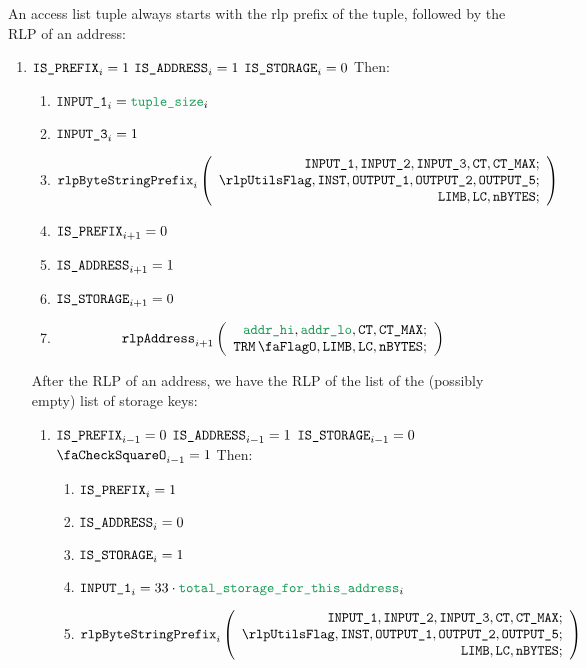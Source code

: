 An access list tuple always starts with the rlp prefix of the tuple, followed by the RLP of an address:
\begin{enumerate}[resume]
	\item \If $\texttt{IS\_PREFIX}_{i} = 1$ \et $\texttt{IS\_ADDRESS}_{i} = 1$ \et $\texttt{IS\_STORAGE}_{i} = 0$ Then:
		\begin{enumerate}
			\item $\inputColumn{1}_{i} = \locAccessListTupleSize_{i}$
			\item $\texttt{INPUT\_3}_{i} = 1$ 
			\item 
				\[
					\rlpBytestringPrefix_{i}
					\left(
					\begin{array}{r}
						\inputColumn{1},
						\inputColumn{2},
						\inputColumn{3},
						\ct,
						\maxCt; \\
						\rlpUtilsFlag,
						\INST,
						\outputColumn{1},
						\outputColumn{2},
						\outputColumn{5}; \\
						\limb,
						\lc,
						\limbsize; \\
					\end{array}
					\right)
				\]
			\item $\texttt{IS\_PREFIX} _{i+1} = 0$
			\item $\texttt{IS\_ADDRESS}   _{i+1} = 1$
			\item $\texttt{IS\_STORAGE}    _{i+1} = 0$	
			\item 
				\[
					\rlpAddress_{i+1}
					\left(
					\begin{array}{r}
						\locAddressHi,
						\locAddressLo,
						\ct,
						\maxCt; \\
						\trmFlag,
						\limb,
						\lc,
						\limbsize; \\
					\end{array}
					\right)
				\]
		\end{enumerate}

		After the RLP of an address, we have the RLP of the list of the (possibly empty) list of storage keys: 
		\begin{enumerate}[resume]
			\item \If $\texttt{IS\_PREFIX}_{i-1} = 0$ \et $\texttt{IS\_ADDRESS}_{i-1} = 1$ \et $\texttt{IS\_STORAGE}_{i-1} = 0$ \et $\done_{i-1} =1$ Then:
				\begin{enumerate}
					\item $\texttt{IS\_PREFIX} _{i} = 1$
					\item $\texttt{IS\_ADDRESS}   _{i} = 0$
					\item $\texttt{IS\_STORAGE}    _{i} = 1$
					\item $\inputColumn{1}_{i} = 33 \cdot \locTotStorageForThisAddress_{i}$
					\item 
						\[
							\rlpBytestringPrefix_{i}
							\left(
							\begin{array}{r}
								\inputColumn{1},
								\inputColumn{2},
								\inputColumn{3},
								\ct,
								\maxCt; \\
								\rlpUtilsFlag,
								\INST,
								\outputColumn{1},
								\outputColumn{2},
								\outputColumn{5}; \\
								\limb,
								\lc,
								\limbsize; \\
							\end{array}
							\right)
						\]


\end{enumerate}
\end{enumerate}
\end{enumerate}
